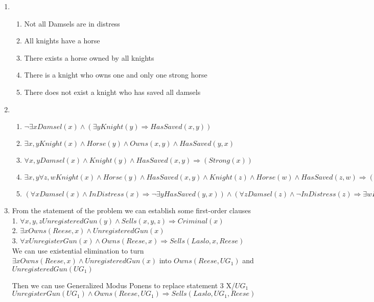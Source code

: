 \documentclass[11pt,fleqn]{article}
\begin{document}
\begin{enumerate}
\item %

\begin{enumerate}
\item %
Not all Damsels are in distress
\item %
All knights have a horse
\item %
There exists a horse owned by all knights
\item %
There is a knight who owns one and only one strong horse
\item %
There does not exist a knight who has saved all damsels

\end{enumerate}

\item %

\begin{enumerate}
\item %
$\lnot \exists x Damsel(x) \land (\exists y Knight(y) \Rightarrow HasSaved(x,y))$
\item %
$\exists x,y Knight(x) \land Horse(y) \land Owns(x,y) \land HasSaved(y,x)$
\item %
$\forall x,y  Damsel(x) \land Knight(y) \land HasSaved(x,y) \Rightarrow (Strong(x) )$
\item %
$\exists x,y \forall z,w Knight(x) \land Horse(y) \land HasSaved(x,y) \land Knight(z) \land  Horse(w) \land HasSaved(z,w) \Rightarrow (x=z \land y=w)$
\item %
$ (\forall x Damsel(x) \land InDistress(x) \Rightarrow \lnot \exists y HasSaved(y,x)) \land (\forall z Damsel(z) \land \lnot InDistress(z) \Rightarrow \exists w HasSaved(w,z))$
\end{enumerate}
\item %
From the statement of the problem we can establish some first-order clauses \\
1. $\forall x,y,z UnregisteredGun(y) \land Sells(x,y,z) \Rightarrow Criminal(x) $ \\
2. $ \exists x Owns(Reese, x) \land UnregisteredGun(x)$ \\ 
3. $ \forall x UnregisterGun(x) \land Owns(Reese, x) \Rightarrow Sells(Laslo, x, Reese) $ \\

We can use existential elimination to turn  $ \exists x Owns(Reese, x) \land UnregisteredGun(x)$ into $Owns(Reese, UG_{1})$ and $UnregisteredGun(UG_{1})$

Then we can use Generalized Modus Ponens to replace statement 3 X/$UG_{1}$
$UnregisterGun(UG_{1}) \land Owns(Reese, UG_{1}) \Rightarrow Sells(Laslo, UG_{1}, Reese) $


\end{enumerate}
\end{document}
